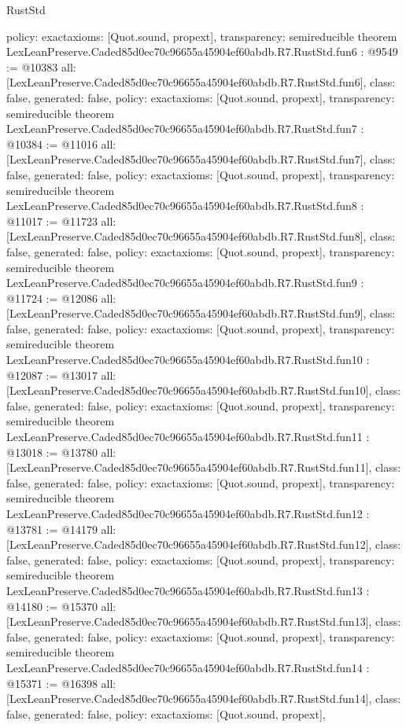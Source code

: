 \begin{lexlean}{RustStd}
\begin{coremodule}
{  policy: exact{axioms: [Quot.sound, propext]},
  transparency: semireducible
}
theorem LexLeanPreserve.Caded85d0ec70c96655a45904ef60abdb.R7.RustStd.fun6 : @9549 := @10383 {
  all: [LexLeanPreserve.Caded85d0ec70c96655a45904ef60abdb.R7.RustStd.fun6],
  class: false,
  generated: false,
  policy: exact{axioms: [Quot.sound, propext]},
  transparency: semireducible
}
theorem LexLeanPreserve.Caded85d0ec70c96655a45904ef60abdb.R7.RustStd.fun7 : @10384 := @11016 {
  all: [LexLeanPreserve.Caded85d0ec70c96655a45904ef60abdb.R7.RustStd.fun7],
  class: false,
  generated: false,
  policy: exact{axioms: [Quot.sound, propext]},
  transparency: semireducible
}
theorem LexLeanPreserve.Caded85d0ec70c96655a45904ef60abdb.R7.RustStd.fun8 : @11017 := @11723 {
  all: [LexLeanPreserve.Caded85d0ec70c96655a45904ef60abdb.R7.RustStd.fun8],
  class: false,
  generated: false,
  policy: exact{axioms: [Quot.sound, propext]},
  transparency: semireducible
}
theorem LexLeanPreserve.Caded85d0ec70c96655a45904ef60abdb.R7.RustStd.fun9 : @11724 := @12086 {
  all: [LexLeanPreserve.Caded85d0ec70c96655a45904ef60abdb.R7.RustStd.fun9],
  class: false,
  generated: false,
  policy: exact{axioms: [Quot.sound, propext]},
  transparency: semireducible
}
theorem LexLeanPreserve.Caded85d0ec70c96655a45904ef60abdb.R7.RustStd.fun10 : @12087 := @13017 {
  all: [LexLeanPreserve.Caded85d0ec70c96655a45904ef60abdb.R7.RustStd.fun10],
  class: false,
  generated: false,
  policy: exact{axioms: [Quot.sound, propext]},
  transparency: semireducible
}
theorem LexLeanPreserve.Caded85d0ec70c96655a45904ef60abdb.R7.RustStd.fun11 : @13018 := @13780 {
  all: [LexLeanPreserve.Caded85d0ec70c96655a45904ef60abdb.R7.RustStd.fun11],
  class: false,
  generated: false,
  policy: exact{axioms: [Quot.sound, propext]},
  transparency: semireducible
}
theorem LexLeanPreserve.Caded85d0ec70c96655a45904ef60abdb.R7.RustStd.fun12 : @13781 := @14179 {
  all: [LexLeanPreserve.Caded85d0ec70c96655a45904ef60abdb.R7.RustStd.fun12],
  class: false,
  generated: false,
  policy: exact{axioms: [Quot.sound, propext]},
  transparency: semireducible
}
theorem LexLeanPreserve.Caded85d0ec70c96655a45904ef60abdb.R7.RustStd.fun13 : @14180 := @15370 {
  all: [LexLeanPreserve.Caded85d0ec70c96655a45904ef60abdb.R7.RustStd.fun13],
  class: false,
  generated: false,
  policy: exact{axioms: [Quot.sound, propext]},
  transparency: semireducible
}
theorem LexLeanPreserve.Caded85d0ec70c96655a45904ef60abdb.R7.RustStd.fun14 : @15371 := @16398 {
  all: [LexLeanPreserve.Caded85d0ec70c96655a45904ef60abdb.R7.RustStd.fun14],
  class: false,
  generated: false,
  policy: exact{axioms: [Quot.sound, propext]},
}
\end{coremodule}
\end{lexlean}
